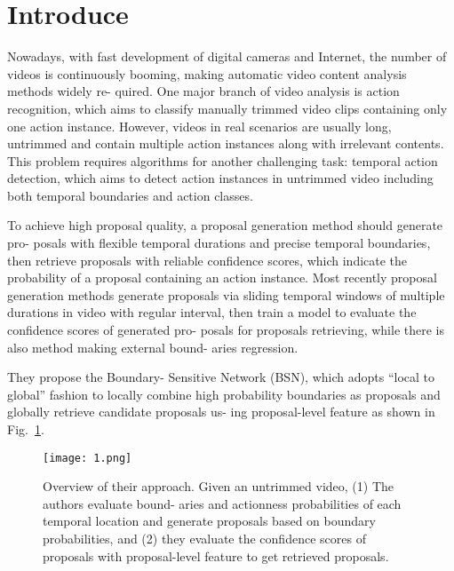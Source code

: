 \documentclass[10pt,twocolumn,letterpaper]{article}
\begin{document}
\section{Introduce}
Nowadays, with fast development of digital cameras and Internet, the number of videos
is continuously booming, making automatic video content analysis methods widely re-
quired. One major branch of video analysis is action recognition, which aims to classify
manually trimmed video clips containing only one action instance. However, videos in
real scenarios are usually long, untrimmed and contain multiple action instances along
with irrelevant contents. This problem requires algorithms for another challenging task:
temporal action detection, which aims to detect action instances in untrimmed video
including both temporal boundaries and action classes.
\par
To achieve high proposal quality, a proposal generation method should generate pro-
posals with flexible temporal durations and precise temporal boundaries, then retrieve
proposals with reliable confidence scores, which indicate the probability of a proposal
containing an action instance. Most recently proposal generation methods \cite{buch2017sst,caba2016fast,escorcia2016daps}
generate proposals via sliding temporal windows of multiple durations in video with
regular interval, then train a model to evaluate the confidence scores of generated pro-
posals for proposals retrieving, while there is also method making external bound-
aries regression.
\par
They propose the Boundary-
Sensitive Network (BSN), which adopts ``local to global'' fashion to locally combine
high probability boundaries as proposals and globally retrieve candidate proposals us-
ing proposal-level feature as shown in Fig.~\ref{fig1}.
\begin{figure}
 \centering
 \texttt{[image: 1.png]}
 \caption{Overview of their approach. Given an untrimmed video, (1) The authors evaluate bound-
 	aries and actionness probabilities of each temporal location and generate proposals
 	based on boundary probabilities, and (2) they evaluate the confidence scores of proposals
 	with proposal-level feature to get retrieved proposals.}
 \label{fig1}
\end{figure}
\end{document}
